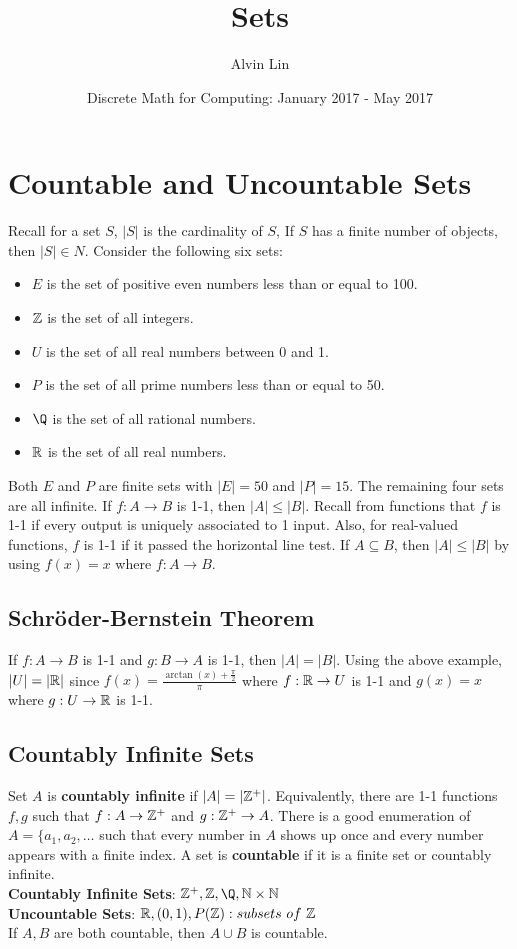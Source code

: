 \documentclass{math}
\title{Sets}
\author{Alvin Lin}
\date{Discrete Math for Computing: January 2017 - May 2017}
\begin{document}
\maketitle

\section*{Countable and Uncountable Sets}
Recall for a set \( S \), \( |S| \) is the cardinality of \( S \), If \( S \)
has a finite number of objects, then \( |S|\in N \). Consider the following
six sets:
\begin{itemize}
  \item \( E \) is the set of positive even numbers less than or equal
    to 100.
  \item \( \mathbb{Z} \) is the set of all integers.
  \item \( U \) is the set of all real numbers between 0 and 1.
  \item \( P \) is the set of all prime numbers less than or equal to
    50.
  \item \( \Q \) is the set of all rational numbers.
  \item \( \mathbb{R} \) is the set of all real numbers.
\end{itemize}
Both \( E \) and \( P \) are finite sets with \( |E| = 50 \) and \( |P| = 15 \).
The remaining four sets are all infinite. If \( f:A\to B \) is 1-1, then
\( |A|\leq|B| \). Recall from functions that \( f \) is 1-1 if every output
is uniquely associated to 1 input. Also, for real-valued functions, \( f \)
is 1-1 if it passed the horizontal line test. If \( A\subseteq B \), then
\( |A|\leq|B| \) by using \( f(x) = x \) where \( f:A\to B \).

\subsection*{Schr{\"o}der-Bernstein Theorem}
If \( f:A\to B \) is 1-1 and \( g:B\to A \) is 1-1, then \( |A| = |B| \).
Using the above example, \( |U| = |\mathbb{R}| \) since \( f(x) =
\frac{\arctan(x)+\frac{\pi}{2}}{\pi} \) where \( f:\mathbb{R}\to U \) is 1-1 and
\( g(x) = x \) where \( g:U\to\mathbb{R} \) is 1-1.

\subsection*{Countably Infinite Sets}
Set \( A \) is \textbf{countably infinite} if \( |A| = |\mathbb{Z}^{+}| \).
Equivalently, there are 1-1 functions \( f,g \) such that \( f:A\to\mathbb{Z}^{+} \) and
\( g:\mathbb{Z}^{+}\to A \). There is a good enumeration of \( A =
\{a_{1},a_{2},\dots\) such that every number in \( A \) shows up once and every
number appears with a finite index. A set is \textbf{countable} if it is a
finite set or countably infinite. \\
\textbf{Countably Infinite Sets}: \( \Z^{+}, \Z, \Q , \N\times\N \) \\
\textbf{Uncountable Sets}: \( \mathbb{R}, (0,1), P(\mathbb{Z}): subsets\ of\ \mathbb{Z} \) \\
If \( A,B \) are both countable, then \( A\cup B \) is countable.
\end{document}
